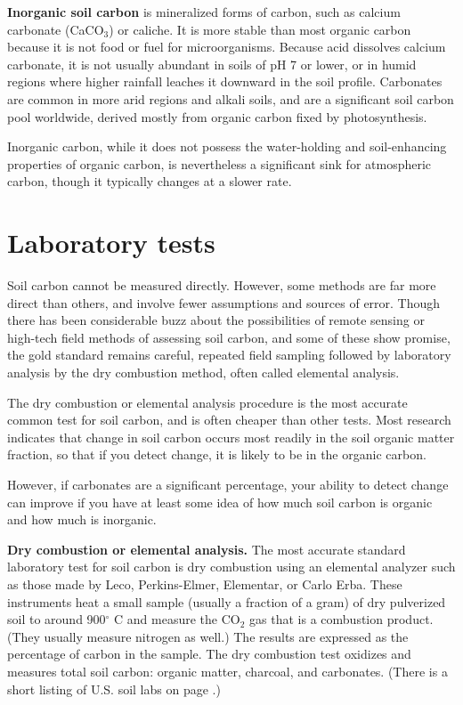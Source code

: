 \documentclass[11pt,letterpaper,oneside,onecolumn]{memoir}
\begin{document}
\textbf{Inorganic soil carbon} is mineralized forms of carbon, such as calcium carbonate (CaCO$_{3}$) or caliche. It is more stable than most organic carbon because it is not food or fuel for microorganisms. Because acid dissolves calcium carbonate, it is not usually abundant in soils of pH 7 or lower, or in humid regions where higher rainfall leaches it downward in the soil profile. Carbonates are common in more arid regions and alkali soils, and are a significant soil carbon pool worldwide, derived mostly from organic carbon fixed by photosynthesis.

Inorganic carbon, while it does not possess the water-holding and soil-enhancing properties of organic carbon, is nevertheless a significant sink for atmospheric carbon, though it typically changes at a slower rate.

\section{Laboratory tests}

Soil carbon cannot be measured directly. However, some methods are far more direct than others, and involve fewer assumptions and sources of error. Though there has been considerable buzz about the possibilities of remote sensing or high-tech field methods of assessing soil carbon, and some of these show promise, the gold standard remains careful, repeated field sampling followed by laboratory analysis by the dry combustion method, often called elemental analysis.

The dry combustion or elemental analysis procedure is the most accurate common test for soil carbon, and is often cheaper than other tests. Most research indicates that change in soil carbon occurs most readily in the soil organic matter fraction, so that if you detect change, it is likely to be in the organic carbon.

However, if carbonates are a significant percentage, your ability to detect change can improve if you have at least some idea of how much soil carbon is organic and how much is inorganic.

\textbf{Dry combustion or elemental analysis.} The most accurate standard laboratory test for soil carbon is dry combustion using an elemental analyzer such as those made by Leco, Perkins-Elmer, Elementar, or Carlo Erba. These instruments heat a small sample (usually a fraction of a gram) of dry pulverized soil to around 900$^{\circ}$ C and measure the CO$_{2}$ gas that is a combustion product. (They usually measure nitrogen as well.) The results are expressed as the percentage of carbon in the sample. The dry combustion test oxidizes and measures total soil carbon: organic matter, charcoal, and carbonates. (There is a short listing of U.S. soil labs on page \pageref{soil labs}.)
\end{document}
